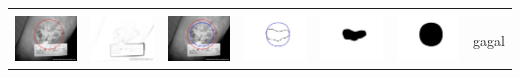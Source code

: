 \begin{table}[H]
\begin{tabular}{|m{0.7in}|m{0.7in}|m{0.7in}|m{0.7in}|m{0.7in}|m{0.7in}|m{0.7in}|}
		&  &  & & & &  \\
		\includegraphics[width=0.7in]{dataset/dataset_3/luka_kuning/ready/38_integer_init.jpg}&
		\includegraphics[width=0.7in]{dataset/dataset_3/luka_kuning/ready/38_integer_ext.jpg}&
		\includegraphics[width=0.7in]{dataset/dataset_3/luka_kuning/ready/38_integer_result.jpg}&
		\includegraphics[width=0.7in]{dataset/dataset_3/luka_kuning/ready/38_gt_r_integer.jpg}&
		\includegraphics[width=0.7in]{dataset/dataset_3/luka_kuning/ready/38_r.jpg}&
		\includegraphics[width=0.7in]{dataset/dataset_3/luka_kuning/ready/38_integer_r.jpg}&
		gagal\\
		\hline
		

\end{tabular}
\end{table}
